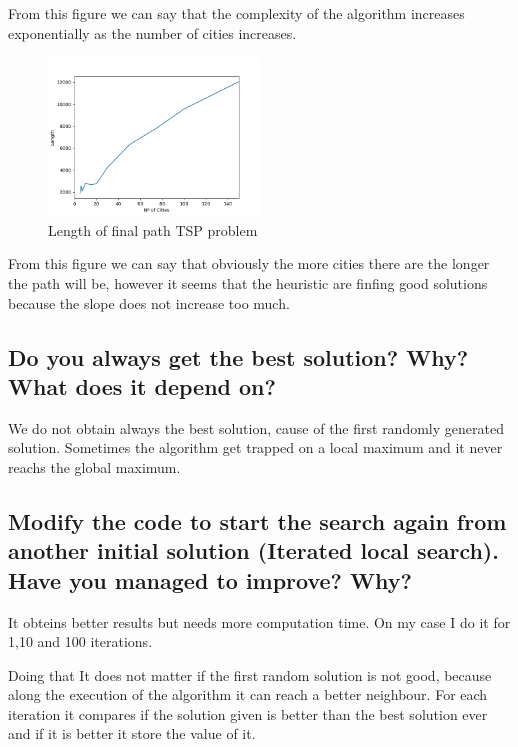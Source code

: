 \documentclass{article}
\begin{document}
        From this figure we can say that the complexity of the algorithm increases exponentially as the number of cities increases.

        \begin{figure}[H]

            \centering
            \includegraphics[width=0.5\textwidth]{../media/02.TSP-cities-length.png}
            \caption{Length of final path TSP problem}
            \label{Length of final path TSP problem}

        \end{figure}

        From this figure we can say that obviously the more cities there are the longer the path will be, however it seems that the heuristic 
        are finfing good solutions because the slope does not increase too much.


    \subsection{Do you always get the best solution? Why? What does it depend on?}

        We do not obtain always the best solution, cause of the first randomly generated solution.
        Sometimes the algorithm get trapped on a local maximum and it never reachs the global maximum.


    \subsection{Modify the code to start the search again from another initial solution (Iterated local search). Have you managed to improve? Why?}
        
        It obteins better results but needs more computation time.
        On my case I do it for 1,10 and 100 iterations.

        Doing that It does not matter if the first random solution is not good, because along the execution of the algorithm it can reach a better neighbour.
        For each iteration it compares if the solution given is better than the best solution ever and if it is better it store the value of it.
\end{document}
